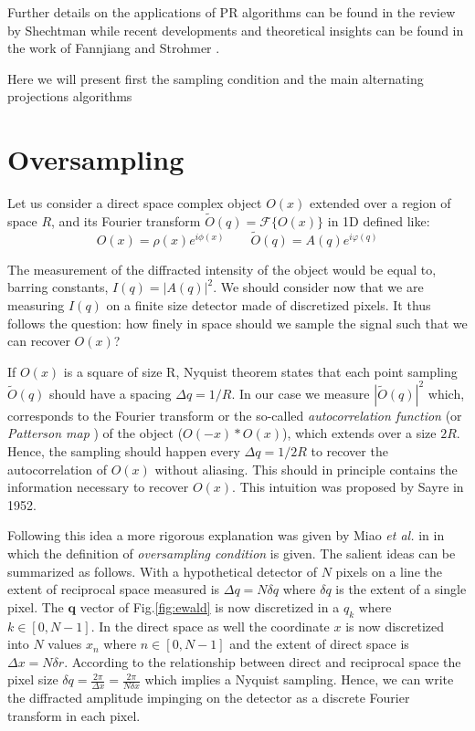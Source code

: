 Further details on the applications of PR algorithms 
can be found in the review by Shechtman \cite{Miao_2015ReviewPhaseRetrieval} while recent developments and theoretical 
insights can be found in the work of Fannjiang and Strohmer \cite{Fannjiang2020}. 

Here we will present first the sampling condition and the main alternating projections algorithms 

\section{Oversampling}\label{sec:oversampling}

Let us consider a direct space complex object $O(x) $ extended over a region of space $R$, and its Fourier transform 
$ \widetilde{O}(q) =\mathcal{F}\{ O(x)\}$ in 1D defined like: 
\begin{equation}
    O(x) = \rho(x)e^{i\phi(x)} \qquad \widetilde{O}(q) = A(q)e^{i\varphi(q)}
\end{equation}

The measurement of the diffracted intensity of the object would be equal to, barring constants, $I(q) = |A(q)|^2$. 
We should consider now that we are measuring $I(q)$ on a finite size detector made of discretized pixels. It thus 
follows the question: how finely in space should we sample the signal such that we can recover $O(x)$? 

If $O(x) $ is a square of size R, Nyquist theorem states that each point sampling $ \widetilde{O}(q)$ should have a 
spacing $ \Delta q = 1/R$. In our case we measure $|\widetilde{O}(q)|^2$ which, corresponds to the Fourier transform or the 
so-called \textit{autocorrelation function} (or \textit{Patterson map} \cite{Patterson1937}) of the object ($O(-x)\ast O(x)$), which extends over a size $2R$. Hence, the sampling should 
happen every $ \Delta q = 1/2R$ to recover the autocorrelation of $O(x) $ without aliasing. This should in principle 
contains the information necessary to recover $O(x) $. This intuition was proposed by Sayre in 1952.

Following this idea a more rigorous explanation was given by Miao \textit{et al.} in \cite{Miao1998} in which the 
definition of \textit{oversampling condition} is given. The salient ideas can be summarized as follows. 
With a hypothetical detector of $N$ pixels on a line the extent of reciprocal space measured is $\Delta q = N\delta q$ 
where $\delta q$ is the extent of a single pixel. The $\mathbf{q}$ vector of Fig.\ref{fig:ewald} is now discretized in 
a $q_k$ where $k \in [0,N-1]$. In the direct space as well the coordinate $x$ is now discretized into $N$ values 
$x_n$ where $n \in [0,N-1]$ and the extent of direct space is $\Delta x = N\delta r$. According to the relationship 
between direct and reciprocal space the pixel size $\delta q = \frac{2\pi}{\Delta x} = \frac{2\pi}{N \delta x}$ which 
implies a Nyquist sampling.
Hence, we can write the diffracted amplitude impinging on the detector as a discrete Fourier transform in each pixel. 

